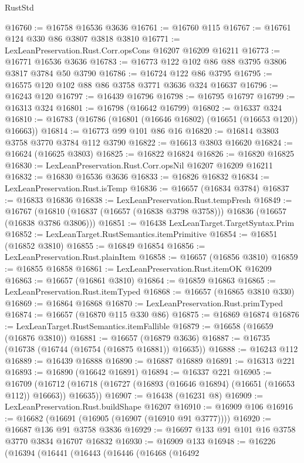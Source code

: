 \begin{lexlean}{RustStd}
\begin{coremodule}
@16760 := @16758 @16536 @3636
@16761 := @16760 @115
@16767 := @16761 @124 @330 @86 @3807 @3818 @3810
@16771 := LexLeanPreservation.Rust.Corr.opsCons @16207 @16209 @16211
@16773 := @16771 @16536 @3636
@16783 := @16773 @122 @102 @86 @88 @3795 @3806 @3817 @3784 @50 @3790
@16786 := @16724 @122 @86 @3795
@16795 := @16575 @120 @102 @88 @86 @3758 @3771 @3636 @324 @16637
@16796 := @16243 @120
@16797 := @16439 @16796
@16798 := @16795 @16797
@16799 := @16313 @324
@16801 := @16798 (@16642 @16799)
@16802 := @16337 @324
@16810 := @16783 (@16786 (@16801 (@16646 @16802) (@16651 (@16653 @120)) @16663))
@16814 := @16773 @99 @101 @86 @16
@16820 := @16814 @3803 @3758 @3770 @3784 @112 @3790
@16822 := @16613 @3803 @16620
@16824 := @16624 (@16625 @3803)
@16825 := @16822 @16824
@16826 := @16820 @16825
@16830 := LexLeanPreservation.Rust.Corr.opsNil @16207 @16209 @16211
@16832 := @16830 @16536 @3636
@16833 := @16826 @16832
@16834 := LexLeanPreservation.Rust.isTemp
@16836 := @16657 (@16834 @3784)
@16837 := @16833 @16836
@16838 := LexLeanPreservation.Rust.tempFresh
@16849 := @16767
    (@16810 (@16837 (@16657 (@16838 @3798 @3758))) @16836 (@16657 (@16838 @3786 @3806)))
@16851 := @16438 LexLeanTarget.TargetSyntax.Prim
@16852 := LexLeanTarget.RustSemantics.itemPrimitive
@16854 := @16851 (@16852 @3810)
@16855 := @16849 @16854
@16856 := LexLeanPreservation.Rust.plainItem
@16858 := @16657 (@16856 @3810)
@16859 := @16855 @16858
@16861 := LexLeanPreservation.Rust.itemOK @16209
@16863 := @16657 (@16861 @3810)
@16864 := @16859 @16863
@16865 := LexLeanPreservation.Rust.itemTyped
@16868 := @16657 (@16865 @3810 @330)
@16869 := @16864 @16868
@16870 := LexLeanPreservation.Rust.primTyped
@16874 := @16657 (@16870 @115 @330 @86)
@16875 := @16869 @16874
@16876 := LexLeanTarget.RustSemantics.itemFallible
@16879 := @16658 (@16659 (@16876 @3810))
@16881 := @16657 (@16879 @3636)
@16887 := @16735 (@16738 (@16744 (@16754 (@16875 @16881)) @16635))
@16888 := @16243 @112
@16889 := @16439 @16888
@16890 := @16887 @16889
@16891 := @16313 @221
@16893 := @16890 (@16642 @16891)
@16894 := @16337 @221
@16905 := @16709
    (@16712 (@16718 (@16727 (@16893 (@16646 @16894) (@16651 (@16653 @112)) @16663)) @16635))
@16907 := @16438 (@16231 @8)
@16909 := LexLeanPreservation.Rust.buildShape @16207
@16910 := @16909 @106
@16916 := @16682 (@16691 (@16905 (@16907 (@16910 @91 @3777))))
@16920 := @16687 @136 @91 @3758 @3836
@16929 := @16697 @133 @91 @101 @16 @3758 @3770 @3834 @16707 @16832
@16930 := @16909 @133
@16948 := @16226
    (@16394
      (@16441
        (@16443
          (@16446
            (@16468
              (@16492

\end{coremodule}
\end{lexlean}
